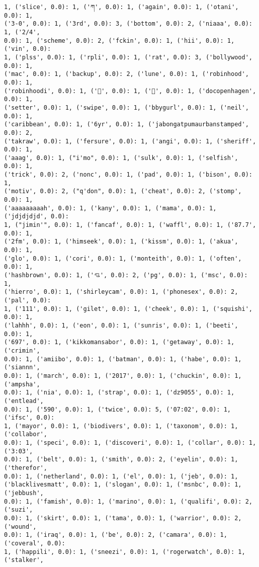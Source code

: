 \documentclass[11pt]{article}
\begin{document}
\begin{Verbatim}[commandchars=\\\{\}]
1, ('slice', 0.0): 1, ('ཀ', 0.0): 1, ('again', 0.0): 1, ('otani', 0.0): 1,
('3-0', 0.0): 1, ('3rd', 0.0): 3, ('bottom', 0.0): 2, ('niaaa', 0.0): 1, ('2/4',
0.0): 1, ('scheme', 0.0): 2, ('fckin', 0.0): 1, ('hii', 0.0): 1, ('vin', 0.0):
1, ('plss', 0.0): 1, ('rpli', 0.0): 1, ('rat', 0.0): 3, ('bollywood', 0.0): 1,
('mac', 0.0): 1, ('backup', 0.0): 2, ('lune', 0.0): 1, ('robinhood', 0.0): 1,
('robinhoodi', 0.0): 1, ('🚙', 0.0): 1, ('💚', 0.0): 1, ('docopenhagen', 0.0): 1,
('setter', 0.0): 1, ('swipe', 0.0): 1, ('bbygurl', 0.0): 1, ('neil', 0.0): 1,
('caribbean', 0.0): 1, ('6yr', 0.0): 1, ('jabongatpumaurbanstamped', 0.0): 2,
('takraw', 0.0): 1, ('fersure', 0.0): 1, ('angi', 0.0): 1, ('sheriff', 0.0): 1,
('aaag', 0.0): 1, ("i'mo", 0.0): 1, ('sulk', 0.0): 1, ('selfish', 0.0): 1,
('trick', 0.0): 2, ('nonc', 0.0): 1, ('pad', 0.0): 1, ('bison', 0.0): 1,
('motiv', 0.0): 2, ("q'don", 0.0): 1, ('cheat', 0.0): 2, ('stomp', 0.0): 1,
('aaaaaaaaah', 0.0): 1, ('kany', 0.0): 1, ('mama', 0.0): 1, ('jdjdjdjd', 0.0):
1, ("jimin'", 0.0): 1, ('fancaf', 0.0): 1, ('waffl', 0.0): 1, ('87.7', 0.0): 1,
('2fm', 0.0): 1, ('himseek', 0.0): 1, ('kissm', 0.0): 1, ('akua', 0.0): 1,
('glo', 0.0): 1, ('cori', 0.0): 1, ('monteith', 0.0): 1, ('often', 0.0): 1,
('hashbrown', 0.0): 1, ('💘', 0.0): 2, ('pg', 0.0): 1, ('msc', 0.0): 1,
('hierro', 0.0): 1, ('shirleycam', 0.0): 1, ('phonesex', 0.0): 2, ('pal', 0.0):
1, ('111', 0.0): 1, ('gilet', 0.0): 1, ('cheek', 0.0): 1, ('squishi', 0.0): 1,
('lahhh', 0.0): 1, ('eon', 0.0): 1, ('sunris', 0.0): 1, ('beeti', 0.0): 1,
('697', 0.0): 1, ('kikkomansabor', 0.0): 1, ('getaway', 0.0): 1, ('crimin',
0.0): 1, ('amiibo', 0.0): 1, ('batman', 0.0): 1, ('habe', 0.0): 1, ('siannn',
0.0): 1, ('march', 0.0): 1, ('2017', 0.0): 1, ('chuckin', 0.0): 1, ('ampsha',
0.0): 1, ('nia', 0.0): 1, ('strap', 0.0): 1, ('dz9055', 0.0): 1, ('entlead',
0.0): 1, ('590', 0.0): 1, ('twice', 0.0): 5, ('07:02', 0.0): 1, ('ifsc', 0.0):
1, ('mayor', 0.0): 1, ('biodivers', 0.0): 1, ('taxonom', 0.0): 1, ('collabor',
0.0): 1, ('speci', 0.0): 1, ('discoveri', 0.0): 1, ('collar', 0.0): 1, ('3:03',
0.0): 1, ('belt', 0.0): 1, ('smith', 0.0): 2, ('eyelin', 0.0): 1, ('therefor',
0.0): 1, ('netherland', 0.0): 1, ('el', 0.0): 1, ('jeb', 0.0): 1,
('blacklivesmatt', 0.0): 1, ('slogan', 0.0): 1, ('msnbc', 0.0): 1, ('jebbush',
0.0): 1, ('famish', 0.0): 1, ('marino', 0.0): 1, ('qualifi', 0.0): 2, ('suzi',
0.0): 1, ('skirt', 0.0): 1, ('tama', 0.0): 1, ('warrior', 0.0): 2, ('wound',
0.0): 1, ('iraq', 0.0): 1, ('be', 0.0): 2, ('camara', 0.0): 1, ('coveral', 0.0):
1, ('happili', 0.0): 1, ('sneezi', 0.0): 1, ('rogerwatch', 0.0): 1, ('stalker',

\end{Verbatim}
\end{document}
